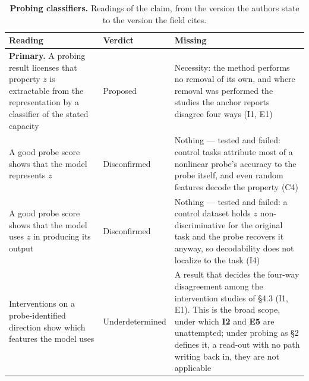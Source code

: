 \clearpage
\begin{table}[H]
\centering
\footnotesize
\caption{\textbf{Probing classifiers.} Readings of the claim, from the version the authors state to the version the
field cites.}
\label{tab:probing-readings}
\renewcommand{\arraystretch}{1.18}
\begin{tabular}{@{}>{\raggedright\arraybackslash}p{3.3cm}l>{\raggedright\arraybackslash}p{4.4cm}@{}}
\toprule
\textbf{Reading} & \textbf{Verdict} & \textbf{Missing} \\
\midrule
\textbf{Primary.} A probing result licenses that property $z$ is extractable from the representation by a classifier of the stated capacity
  & Proposed
  & Necessity: the method performs no removal of its own, and where removal was performed the studies the anchor reports disagree four ways (I1, E1) \\
\addlinespace[2pt]
A good probe score shows that the model represents $z$
  & Disconfirmed
  & Nothing --- tested and failed: control tasks attribute most of a nonlinear probe's accuracy to the probe itself, and even random features decode the property (C4) \\
\addlinespace[2pt]
A good probe score shows that the model uses $z$ in producing its output
  & Disconfirmed
  & Nothing --- tested and failed: a control dataset holds $z$ non-discriminative for the original task and the probe recovers it anyway, so decodability does not localize to the task (I4) \\
\addlinespace[2pt]
Interventions on a probe-identified direction show which features the model uses
  & Underdetermined
  & A result that decides the four-way disagreement among the intervention studies of \S4.3 (I1, E1). This is the broad scope, under which \textbf{I2} and \textbf{E5} are unattempted; under probing as \S2 defines it, a read-out with no path writing back in, they are not applicable \\
\bottomrule
\end{tabular}
\end{table}

